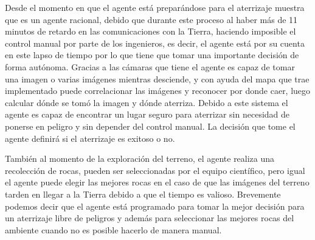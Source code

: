 \documentclass{article}
\begin{document}
            Desde el momento en que el agente está preparándose para el aterrizaje muestra que es un agente racional, debido que durante este proceso al haber más de 11 minutos de retardo en las comunicaciones con la Tierra, haciendo imposible el control manual por parte de los ingenieros, es decir, el agente está por su cuenta en este lapso de tiempo por lo que tiene que tomar una importante decisión de forma autónoma. Gracias a las cámaras que tiene el agente es capaz de tomar una imagen o varias imágenes mientras desciende, y con ayuda del mapa que trae implementado puede correlacionar las imágenes y reconocer por donde caer, luego calcular dónde se tomó la imagen y dónde aterriza. Debido a este sistema el agente es capaz de encontrar un lugar seguro para aterrizar sin necesidad de ponerse en peligro y sin depender del control manual. La decisión que tome el agente definirá si el aterrizaje es exitoso o no.

            También al momento de la exploración del terreno, el agente realiza una recolección de rocas, pueden ser seleccionadas por el equipo científico, pero igual el agente puede elegir las mejores rocas en el caso de que las imágenes del terreno tarden en llegar a la Tierra debido a que el tiempo es valioso.
            Brevemente podemos decir que el agente está programado para tomar la mejor decisión para un aterrizaje libre de peligros y además para seleccionar las mejores rocas del ambiente cuando no es posible hacerlo de manera manual.
        
\end{document}
